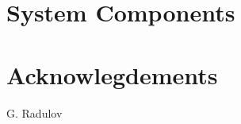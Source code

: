 


\begingroup
\obeylines

\endgroup

\IEEEpeerreviewmaketitle

\IEEEpubidadjcol

\begingroup
\obeylines

\endgroup

\begingroup
\obeylines

\endgroup

\section{System Components}

\begingroup
\obeylines

\endgroup

\begingroup
\obeylines

\endgroup

\begingroup
\obeylines

\endgroup

\begingroup
\obeylines

\endgroup

\begingroup
\obeylines

\endgroup

\begingroup
\obeylines

\endgroup



\section*{Acknowlegdements}
G. Radulov



